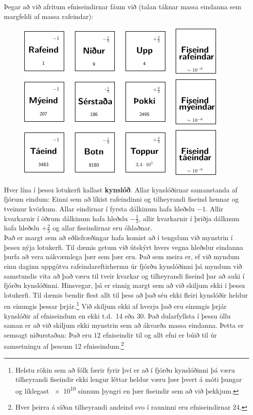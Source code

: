 \ifdefined \wholebook \else\documentclass[oneside]{book}\usepackage{EdlBook}\graphicspath{{figures/}}
\begin{document}
Þegar að við afritum efniseindirnar fáum við (talan táknar massa eindanna sem margfeldi af massa rafeindar):


\begin{figure}[H]
    \centering
    \includegraphics[width=.5\textwidth]{figures/lotukerfi5.pdf}
\end{figure}

Hver lína í þessu lotukerfi kallast \textbf{kynslóð}. Allar kynslóðirnar samanstanda af fjórum eindum: Einni sem að líkist rafeindinni og tilheyrandi fiseind hennar og tveimur kvörkum. Allar eindirnar í fyrsta dálkinum hafa hleðslu $-1$. Allir kvarkarnir í öðrum dálkinum hafa hleðslu $-\frac{1}{3}$, allir kvarkarnir í þriðja dálknum hafa hleðslu $+\frac{2}{3}$ og allar fiseindirnar eru óhlaðnar. \\

Það er margt sem að eðlisfræðingar hafa komist að í tengslum við mynstrin í þessu nýja lotukerfi. Til dæmis getum við útskýrt hvers vegna hleðslur eindanna þurfa að vera nákvæmlega þær sem þær eru. Það sem meira er, ef við myndum einn daginn uppgötva rafeindareftirhermu úr fjórðu kynslóðinni þá myndum við samstundis vita að það væru til tveir kvarkar og tilheyrandi fiseind þar að auki í fjórðu kynslóðinni. Hinsvegar, þá er einnig margt sem að við skiljum ekki í þessu lotukerfi. Til dæmis bendir flest allt til þess að það séu ekki fleiri kynslóðir heldur en einungis þessar þrjár.\footnote{Helstu rökin sem að fólk færir fyrir því er að í fjórðu kynslóðinni þá væru tilheyrandi fiseindir ekki lengur léttar heldur væru þær þvert á móti þungar og líklegast \SI{e10}{} sinnum þyngri en þær fiseindir sem að við þekkjum.} Við skiljum ekki af hverju það eru einungis þrjár kynslóðir af efniseindum en ekki t.d.~14 eða 30. Það dularfyllsta í þessu öllu saman er að við skiljum ekki mynstrin sem að ákvarða massa eindanna. Þetta er semsagt niðurstaðan: Það eru $12$ efniseindir til og allt efni er búið til úr samsetningu af þessum $12$ efniseindum.\footnote{Hver þeirra á síðan tilheyrandi andeind svo í rauninni eru efniseindirnar 24.} \\
\end{document}
